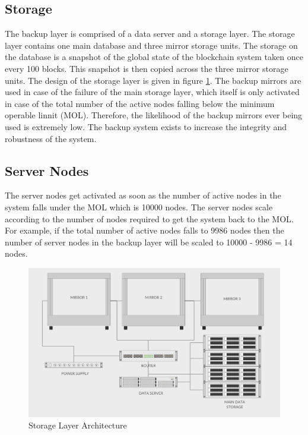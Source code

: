 \documentclass[a4paper,twoside,phd]{BYUPhys}
\begin{document}
\subsection{Storage}
The backup layer is comprised of a data server and a storage layer. The storage layer contains one main database and three mirror storage units. The storage on the database is a snapshot of the global state of the blockchain system taken once every 100 blocks. This snapshot is then copied across the three mirror storage units. The design of the storage layer is given in figure \ref{fig:3}. The backup mirrors are used in case of the failure of the main storage layer, which itself is only activated in case of the total number of the active nodes falling below the minimum operable linnit (MOL). Therefore, the likelihood of the backup mirrors ever being used is extremely low. The backup system exists to increase the integrity and robustness of the system.

\subsection{Server Nodes}
The server nodes get activated as soon as the number of active nodes in the system falls under the MOL which is 10000 nodes. The server nodes scale according to the number of nodes required to get the system back to the MOL. For example, if the total number of active nodes falls to 9986 nodes then the number of server nodes in the backup layer will be scaled to 10000 - 9986 = 14 nodes.
\begin{figure}
  \includegraphics[width=\linewidth]{storage_layer.png}
  \caption{Storage Layer Architecture}
  \label{fig:3}
\end{figure}
\end{document}
